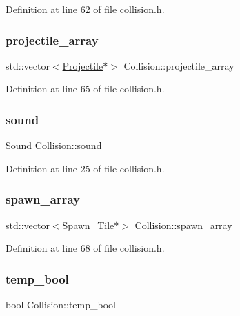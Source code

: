 Definition at line 62 of file collision.\+h.

\hypertarget{class_collision_a3828188ff3bdc4f1f4b5dbfc018552a8}{}\label{class_collision_a3828188ff3bdc4f1f4b5dbfc018552a8} 
\subsubsection{\texorpdfstring{projectile\+\_\+array}{projectile\_array}}
{\footnotesize\ttfamily std\+::vector$<$\hyperlink{class_projectile}{Projectile}$\ast$$>$ Collision\+::projectile\+\_\+array}



Definition at line 65 of file collision.\+h.

\hypertarget{class_collision_a9b9063978438db5e9502be4607986ebe}{}\label{class_collision_a9b9063978438db5e9502be4607986ebe} 
\subsubsection{\texorpdfstring{sound}{sound}}
{\footnotesize\ttfamily \hyperlink{class_sound}{Sound} Collision\+::sound}



Definition at line 25 of file collision.\+h.

\hypertarget{class_collision_a5e65730ac3bebe98253379ed7aab0ec5}{}\label{class_collision_a5e65730ac3bebe98253379ed7aab0ec5} 
\subsubsection{\texorpdfstring{spawn\+\_\+array}{spawn\_array}}
{\footnotesize\ttfamily std\+::vector$<$\hyperlink{class_spawn___tile}{Spawn\+\_\+\+Tile}$\ast$$>$ Collision\+::spawn\+\_\+array}



Definition at line 68 of file collision.\+h.

\hypertarget{class_collision_aefd970d4b59cfd5ca8fd5d3675532f23}{}\label{class_collision_aefd970d4b59cfd5ca8fd5d3675532f23} 
\subsubsection{\texorpdfstring{temp\+\_\+bool}{temp\_bool}}
{\footnotesize\ttfamily bool Collision\+::temp\+\_\+bool\hspace{0.3cm}{\ttfamily [protected]}}



